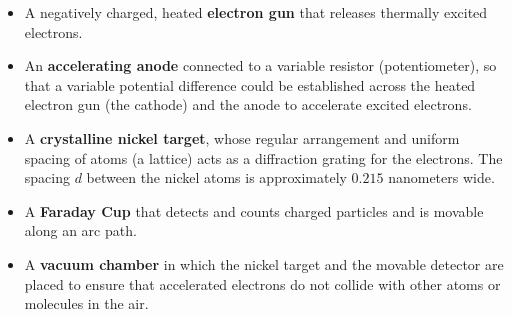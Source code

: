 \begin{itemize}

	\item A negatively charged, heated \textbf{electron gun} that releases thermally excited electrons.

	\item An \textbf{accelerating anode} connected to a variable resistor (potentiometer), so that a variable potential difference could be established across the heated electron gun (the cathode) and the anode to accelerate excited electrons.

	\item A \textbf{crystalline nickel target}, whose regular arrangement and uniform spacing of atoms (a lattice) acts as a diffraction grating for the electrons. The spacing $d$ between the nickel atoms is approximately $0.215$ nanometers wide.

	\item A \textbf{Faraday Cup} that detects and counts charged particles and is movable along an arc path. 

	\item A \textbf{vacuum chamber} in which the nickel target and the movable detector are placed to ensure that accelerated electrons do not collide with other atoms or molecules in the air.

\end{itemize}

